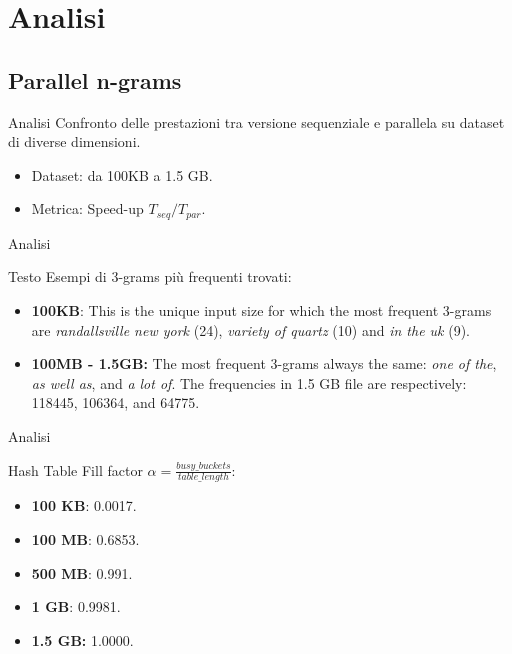 \section{Analisi}
\subsection{Parallel n-grams}

\begin{frame}{Analisi}
    Confronto delle prestazioni tra versione sequenziale e parallela su dataset di diverse dimensioni.
    \begin{itemize}
        \item Dataset: da 100KB a 1.5 GB.
        \item Metrica: Speed-up $T_{seq} / T_{par}$.
    \end{itemize}
\end{frame}

\begin{frame}{Analisi}
    \begin{block}{Testo}
        Esempi di 3-grams più frequenti trovati:
        \begin{itemize}
            \item \textbf{100KB}: This is the unique input size for which the most frequent 3-grams are \textit{randallsville new york} (24), \textit{variety of quartz} (10) and \textit{in the uk} (9).
            \item \textbf{100MB - 1.5GB:} The most frequent 3-grams always the same: \textit{one of the}, \textit{as well as}, and \textit{a lot of}. The frequencies in 1.5 GB file are respectively: 118445, 106364, and 64775.
        \end{itemize}
    \end{block}
\end{frame}

\begin{frame}{Analisi}
    \begin{block}{Hash Table}
        Fill factor $\alpha=\tfrac{busy\_buckets}{table\_length}$:
        \begin{itemize}
            \item \textbf{100 KB}: 0.0017.
            \item \textbf{100 MB}: 0.6853.
            \item \textbf{500 MB}: 0.991.
            \item \textbf{1 GB}: 0.9981.
            \item \textbf{1.5 GB:} 1.0000.
        \end{itemize}
    \end{block}
\end{frame}

